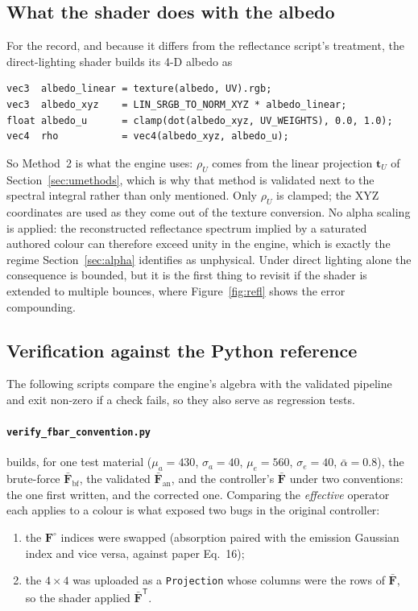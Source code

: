 \documentclass[11pt,a4paper]{article}
\newcommand{\mFb}{\bar{\mathbf{F}}}
\newcommand{\mFc}{\mathbf{F}^{\circ}}
\newcommand{\transp}{^{\mathsf{T}}}
\newcommand{\file}[1]{\texttt{#1}}
\newcommand{\code}[1]{\texttt{#1}}
\begin{document}
\subsection{What the shader does with the albedo}
\label{sec:shader-albedo}

For the record, and because it differs from the reflectance script's treatment,
the direct-lighting shader builds its 4-D albedo as
\begin{verbatim}
vec3  albedo_linear = texture(albedo, UV).rgb;
vec3  albedo_xyz    = LIN_SRGB_TO_NORM_XYZ * albedo_linear;
float albedo_u      = clamp(dot(albedo_xyz, UV_WEIGHTS), 0.0, 1.0);
vec4  rho           = vec4(albedo_xyz, albedo_u);
\end{verbatim}
So Method~2 is what the engine uses: $\rho_U$ comes from the linear projection
$\mathbf t_U$ of Section~\ref{sec:umethods}, which is why that method is
validated next to the spectral integral rather than only mentioned.  Only
$\rho_U$ is clamped; the XYZ coordinates are used as they come out of the
texture conversion.  No alpha scaling is applied: the reconstructed
reflectance spectrum implied by a
saturated authored colour can therefore exceed unity in the engine, which is
exactly the regime Section~\ref{sec:alpha} identifies as unphysical.  Under
direct lighting alone the consequence is bounded, but it is the first thing to
revisit if the shader is extended to multiple bounces, where
Figure~\ref{fig:refl} shows the error compounding.

\subsection{Verification against the Python reference}

The following scripts compare the engine's algebra with the validated pipeline
and exit non-zero if a check fails, so they also serve as regression tests.

\paragraph{\file{verify\_fbar\_convention.py}} builds, for one test material
($\mu_a=430$, $\sigma_a=40$, $\mu_e=560$, $\sigma_e=40$, $\bar\alpha=0.8$),
the brute-force $\mFb_{\text{bf}}$, the validated $\mFb_{\text{an}}$, and the
controller's $\mFb$ under two conventions: the one first written, and the
corrected one.  Comparing the \emph{effective} operator each applies to a
colour is what exposed two bugs in the original controller:
\begin{enumerate}[nosep]
  \item the $\mFc$ indices were swapped (absorption paired with the emission
        Gaussian index and vice versa, against paper Eq.~16);
  \item the $4\times4$ was uploaded as a \code{Projection} whose columns were
        the rows of $\mFb$, so the shader applied $\mFb\transp$.
\end{enumerate}
\end{document}
